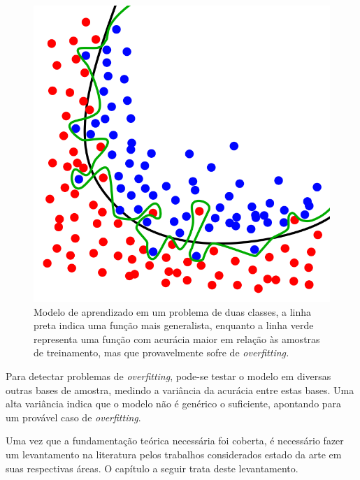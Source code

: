 \begin{figure}[h!]
  \centering
  \includegraphics[scale=0.3]{imgs/overfitting}
  \caption{Modelo de aprendizado em um problema de duas classes, a linha preta indica uma função mais generalista, enquanto a linha verde representa uma função com acurácia maior em relação às amostras de treinamento, mas que provavelmente sofre de \textit{overfitting.}}
  \label{fig:overfitting}
\end{figure}

Para detectar problemas de \textit{overfitting}, pode-se testar o modelo em diversas outras bases de amostra, medindo a variância da acurácia entre estas bases. Uma alta variância indica que o modelo não é genérico o suficiente, apontando para um provável caso de \textit{overfitting}.

Uma vez que a fundamentação teórica necessária foi coberta, é necessário fazer um levantamento na literatura pelos trabalhos considerados estado da arte em suas respectivas áreas. O capítulo a seguir trata deste levantamento.